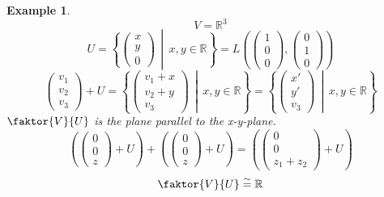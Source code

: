 \documentclass[a4paper,landscape,twocolumn]{article}
\newcommand\setdef[2]{\left\{#1\,\middle|\,#2\right\}}
\newtheorem{ex}{Example}
\begin{document}
\begin{ex}
  \label{bsp-4-25}
  \[ V = \mathbb R^3 \]
  \[
    U = \setdef{\begin{pmatrix} x \\ y \\ 0\end{pmatrix}}{x,y \in \mathbb R}
      = L\left(\begin{pmatrix} 1 \\ 0 \\ 0 \end{pmatrix}, \begin{pmatrix} 0 \\ 1 \\ 0 \end{pmatrix}\right)
  \] \[
    \begin{pmatrix} v_1 \\ v_2 \\ v_3 \end{pmatrix} + U
      = \setdef{\begin{pmatrix} v_1 + x \\ v_2 + y \\ v_3 \end{pmatrix}}{x,y \in \mathbb R}
      = \setdef{\begin{pmatrix} x' \\ y' \\ v_3 \end{pmatrix}}{x,y \in \mathbb R}
  \]
  $\faktor{V}{U}$ is the plane parallel to the x-y-plane.
  \[
    \left(\begin{pmatrix} 0 \\ 0 \\ z \end{pmatrix} + U\right)
    + \left(\begin{pmatrix} 0 \\ 0 \\ z \end{pmatrix} + U\right)
    = \left(\begin{pmatrix} 0 \\ 0 \\ z_1 + z_2 \end{pmatrix} + U\right)
  \]
  \[ \faktor{V}{U} \stackrel\sim{=} \mathbb R \]
\end{ex}
\end{document}
